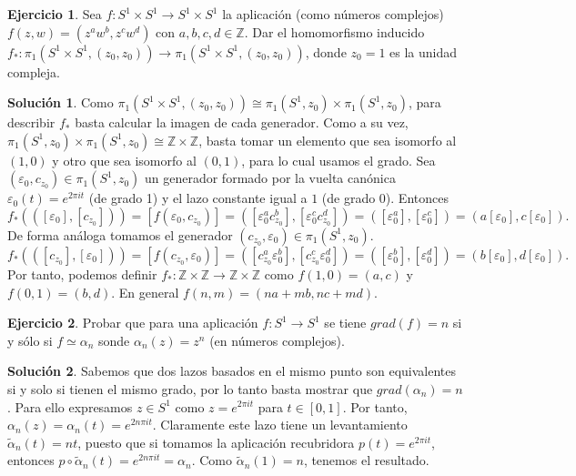 \documentclass{article}
\theoremstyle{plain}
\theoremstyle{definition}
\newtheorem{exercise}{Ejercicio}
\newtheorem*{sol*}{Solución}
\newcommand{\Z}{\mathbb{Z}}
\begin{document}
\begin{exercise}
\label{pl11.n1} Sea $f:S^1\times S^1 \to S^1 \times S^1$ la aplicaci\'on (como n\'umeros complejos) $f(z,w)=(z^a
w^b,z^c w^d)$ con $a,b,c,d \in \mathbb{Z}$. Dar el homomorfismo inducido
$f_*: \pi_1(S^1\times S^1,(z_0,z_0)) \to \pi_1(S^1\times S^1,(z_0,z_0))$, donde $z_0 = 1$ es la unidad compleja.
\end{exercise}
\begin{sol*}
Como $\pi_1(S^1\times S^1,(z_0,z_0))\cong\pi_1(S^1,z_0)\times\pi_1(S^1,z_0)$, para describir $f_*$ basta calcular la imagen de cada generador. Como a su vez, $\pi_1(S^1,z_0)\times\pi_1(S^1,z_0)\cong\Z\times\Z$, basta tomar un elemento que sea isomorfo al $(1,0)$ y otro que sea isomorfo al $(0,1)$, para lo cual usamos el grado. Sea $(\varepsilon_0,c_{z_0})\in\pi_1(S^1,z_0)$ un generador formado por la vuelta canónica $\varepsilon_0(t)=e^{2\pi it}$ (de grado 1) y el lazo constante igual a $1$ (de grado 0). Entonces
\[
f_*(([\varepsilon_0],[c_{z_0}]))=[f(\varepsilon_0,c_{z_0})]=([\varepsilon_0^a c_{z_0}^b],[\varepsilon_0^c c_{z_0}^d])=([\varepsilon_0^a],[\varepsilon_0^c])=(a[\varepsilon_0],c[\varepsilon_0]).
\]
De forma análoga tomamos el generador $(c_{z_0},\varepsilon_0)\in\pi_1(S^1,z_0)$.
\[
f_*(([c_{z_0}],[\varepsilon_0]))=[f(c_{z_0},\varepsilon_0)]=([c_{z_0}^a \varepsilon_0^b],[c_{z_0}^c\varepsilon_0^d])=([\varepsilon_0^b],[\varepsilon_0^d])=(b[\varepsilon_0],d[\varepsilon_0]).
\]
Por tanto, podemos definir $f_*:\Z\times\Z\to\Z\times\Z$ como $f(1,0)=(a,c)$ y $f(0,1)=(b,d)$. En general $f(n,m)=(na+mb,nc+md)$.
\end{sol*}

\newpage

\begin{exercise}
Probar que para una aplicaci\'on $f: S^1\to S^1$ se tiene $grad(f) = n$ si y s\'olo si $f\simeq \alpha_n$ sonde
$\alpha_n(z) = z^n$ (en n\'umeros complejos).
\end{exercise}
\begin{sol*}
Sabemos que dos lazos basados en el mismo punto son equivalentes si y solo si tienen el mismo grado, por lo tanto basta mostrar que $grad(\alpha_n)=n$. Para ello expresamos $z\in S^1$ como $z=e^{2\pi it}$ para $t\in[0,1]$. Por tanto, $\alpha_n(z)=\alpha_n(t)=e^{2n\pi i t}$. Claramente este lazo tiene un levantamiento $\tilde{\alpha}_n(t)=nt$, puesto que si tomamos la aplicación recubridora $p(t)=e^{2\pi it}$, entonces $p\circ\tilde{\alpha}_n(t)=e^{2n\pi it}=\alpha_n$. Como $\tilde{\alpha}_n(1)=n$, tenemos el resultado.
\end{sol*}
\newpage
\end{document}
